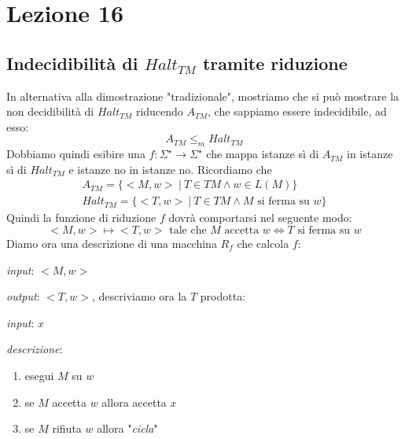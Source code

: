 
\section{Lezione 16}

\subsection{Indecidibilità di $Halt_{TM}$ tramite riduzione}

In alternativa alla dimostrazione "tradizionale", mostriamo che si può mostrare la non decidibilità di $Halt_{TM}$ riducendo $A_{TM}$, che sappiamo essere indecidibile, ad esso:
$$A_{TM} \leq_{m} Halt_{TM}$$
Dobbiamo quindi esibire una $f: \Sigma^{\star} \to \Sigma^{\star}$ che mappa istanze sì di $A_{TM}$ in istanze sì di $Halt_{TM}$ e istanze no in istanze no. Ricordiamo che 
\begin{gather*}
A_{TM} = \{ <M, w> \ | \ T \in TM \land w \in L(M) \} \\
Halt_{TM} = \{ <T, w> \ | \ T \in TM \land M \text{ si ferma su } w \}
\end{gather*}
Quindi la funzione di riduzione $f$ dovrà comportarsi nel seguente modo:
\[
	<M, w> \mapsto <T, w> \text{ tale che } M \text{ accetta } w \iff T \text{ si ferma su } w
\]
Diamo ora una descrizione di una macchina $R_f$ che calcola $f$:
\begin{description}
\item \textit{input}: $<M, w>$

\item \textit{output}: $<T, w>$, descriviamo ora la $T$ prodotta:

\begin{description}
\item \textit{input}: $x$

\item \textit{descrizione}: 
\begin{enumerate}
\item esegui $M$ su $w$
\item se $M$ accetta $w$ allora accetta $x$
\item se $M$ rifiuta $w$ allora "\textit{cicla}"
\end{enumerate}
\end{description}
\end{description}

